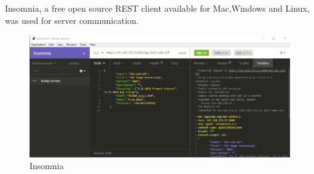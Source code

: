 Insomnia, a free open source REST client available for Mac,Windows and Linux, was used for server communication.

\begin{figure}[h]
\centering
\includegraphics[width=1\textwidth]{sections/methodology/insomnia.png}
\caption{\label{fig:gic} Insomnia}
\end{figure}





















